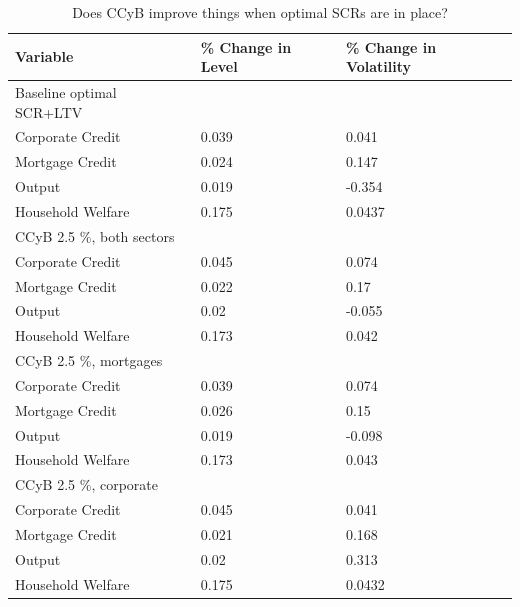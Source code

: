 \documentclass[12pt]{article}
\numberwithin{equation}{section}
\begin{document}
\begin{table}[h]
\caption{Does CCyB improve things when optimal SCRs are in place?}
\begin{tabular}{l|l|l}
\small
Variable & \% Change in Level & \% Change in Volatility \\
\hline
Baseline optimal SCR+LTV & & \\
\hline
    Corporate Credit           &       0.039    &      0.041 \\
    Mortgage Credit            &      0.024    &       0.147 \\
    Output         &     0.019    &    -0.354 \\ 
    Household Welfare       &     0.175     &     0.0437\\
\hline
CCyB 2.5 \%, both sectors & & \\
\hline
    Corporate Credit           &       0.045    &     0.074 \\
    Mortgage Credit            &      0.022    &      0.17 \\
    Output         				&     0.02    &    -0.055 \\ 
    Household Welfare       &     0.173     &     0.042\\
\hline
CCyB 2.5 \%, mortgages  & & \\
\hline
    Corporate Credit           &       0.039    &     0.074 \\
    Mortgage Credit            &      0.026    &      0.15 \\
    Output         				&     0.019    &    -0.098 \\ 
    Household Welfare       &     0.173     &     0.043\\
 \hline
CCyB 2.5 \%, corporate  & & \\
\hline
    Corporate Credit           &       0.045    &     0.041 \\
    Mortgage Credit            &      0.021    &      0.168 \\
    Output         				&     0.02    &    0.313 \\ 
    Household Welfare       &     0.175     &     0.0432\\   

\end{tabular}
\end{table}
\end{document}
